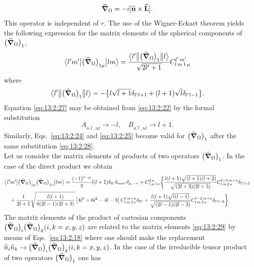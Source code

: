 \begin{equation*}
\widehat{\boldsymbol{\nabla}}_{\Omega}=-i[\widehat{\mathbf{n}} \times \widehat{\mathbf{L}}].
\end{equation*}
This operator is independent of \(r\). The use of the Wigner-Eckart theorem yields the following expression for the matrix elements of the spherical components of \(\bigl(\widehat{\boldsymbol{\nabla}}_{\Omega}\bigr)_{1}\),
\begin{equation}
\bigl\langle  l^{\prime} m^{\prime} \big| \bigl(\widehat{\boldsymbol{\nabla}}_{\Omega}\bigr)_{1 \mu} \big| l m \bigr\rangle=\frac{
\bigl\langle  l^{\prime} \big\Vert \bigl(\widehat{\boldsymbol{\nabla}}_{\Omega}\bigr)_{1} \big\Vert  l \bigr\rangle}{\sqrt{2 l^{\prime}+1}} 
C_{l\,m\,1\,\mu}^{l^{\prime}\,m^{\prime}} \label{eq:13:2:26}
\end{equation}
where
\begin{equation}
\bigl\langle  l^{\prime} \big\Vert \bigl(\widehat{\boldsymbol{\nabla}}_{\Omega}\bigr)_{1} \big\Vert  l \bigr\rangle=-\bigl\{l \sqrt{l+1} \delta_{l^{\prime} l+1}+(l+1) \sqrt{l} \delta_{l^{\prime} l-1}\bigr\}. \label{eq:13:2:27}
\end{equation}
Equation \eqref{eq:13:2:27} may be obtained from \eqref{eq:13:2:22} by the formal substitution
\begin{equation}
A_{n^{\prime} l^{\prime}, n l} \rightarrow-l, \quad B_{n^{\prime} l^{\prime}, n l} \rightarrow l+1 . \label{eq:13:2:28}
\end{equation}
Similarly, Eqs.~\eqref{eq:13:2:24} and \eqref{eq:13:2:25} become valid for \(\bigl(\widehat{\boldsymbol{\nabla}}_{\Omega}\bigr)_{1}\) after the same substitution \eqref{eq:13:2:28}.\\
Let us consider the matrix elements of products of two operators \(\bigl(\widehat{\boldsymbol{\nabla}}_{\Omega}\bigr)_{1}\). In the case of the direct product we obtain
\begin{align}
& 
\bigl\langle  l^{\prime} m^{\prime} \big| \bigl(\widehat{\boldsymbol{\nabla}}_{\Omega}\bigr)_{1 \mu}\bigl(\widehat{\boldsymbol{\nabla}}_{\Omega}\bigr)_{1 \nu} \big| l m \bigr\rangle=\frac{(-1)^{1-\mu}}{3} l(l+1) \delta_{l l^{\prime}} \delta_{m m^{\prime}} \delta_{\mu,-\nu}+
C_{1\,\mu\,1\,\nu}^{2\,\kappa}\biggl\{\frac{l(l+1) \sqrt{(l+1)(l+2)}}{\sqrt{(2 l+3)(2 l+5)}} 
C_{l\,m\,2\,\kappa}^{l+2\,m+\kappa} \delta_{l^{\prime} l+2} \notag\\
& \quad+\frac{1}{2 l+1} \sqrt{\frac{l(l+1)}{6(2 l-1)(2 l+3)}}\left[4 l^{3}+6 l^{2}-4 l-3\right] 
C_{l\,m\,2\,\kappa}^{l\,m+\kappa} \delta_{l l^{\prime}}+\frac{l(l+1) \sqrt{l(l-1)}}{\sqrt{(2 l-1)(2 l-3)}} 
C_{l\,m\,2\,\kappa}^{l-2\,m+\kappa} \delta_{l^{\prime} l-2}\biggr\}. \label{eq:13:2:29}
\end{align}
The matrix elements of the product of cartesian components \(\bigl(\widehat{\boldsymbol{\nabla}}_{\Omega}\bigr)_{i}\bigl(\widehat{\boldsymbol{\nabla}}_{\Omega}\bigr)_{k}(i, k=x, y, z)\) are related to the matrix elements \eqref{eq:13:2:29} by means of Eqs.~\eqref{eq:13:2:18} where one should make the replacement \(\widehat{n}_{i} \widehat{n}_{k} \rightarrow\bigl(\widehat{\boldsymbol{\nabla}}_{\Omega}\bigr)_{i}\bigl(\widehat{\boldsymbol{\nabla}}_{\Omega}\bigr)_{k}(i, k=x, y, z)\). In the case of the irreducible tensor product of two operators \(\bigl(\widehat{\boldsymbol{\nabla}}_{\Omega}\bigr)_{1}\) one has
